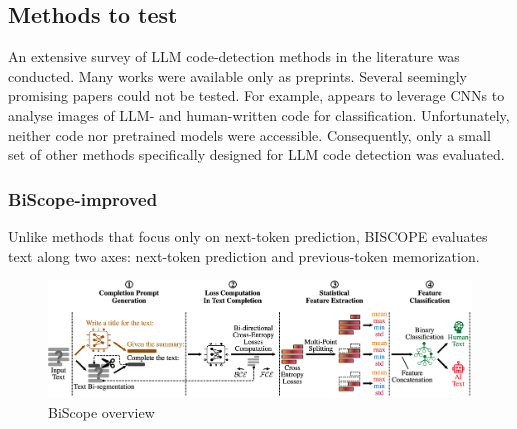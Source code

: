 \subsection{Methods to test}
An extensive survey of LLM code-detection methods 
in the literature was conducted. Many works were available 
only as preprints. Several seemingly promising papers could 
not be tested. For example, \cite{xu2025codevision} appears 
to leverage CNNs to analyse images of LLM- and human-written 
code for classification. Unfortunately, neither code nor 
pretrained models were accessible. Consequently, only a small 
set of other methods specifically designed for LLM code detection 
was evaluated.








\subsubsection{BiScope-improved}
Unlike methods that focus only on next-token prediction, 
BISCOPE evaluates text along two axes: next-token prediction 
and previous-token memorization.

\begin{figure}[H]
    \centering
    \includegraphics[width=1\textwidth]{img/BiScope/Overview.png}
    \caption{BiScope overview}
    \label{fig:BiScope-overview}
\end{figure}

